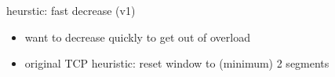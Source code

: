 \begin{frame}{heurstic: fast decrease (v1)}
    \begin{itemize}
    \item want to decrease quickly to get out of overload
    \item original TCP heuristic: reset window to (minimum) 2 segments
    \end{itemize}
\end{frame}
